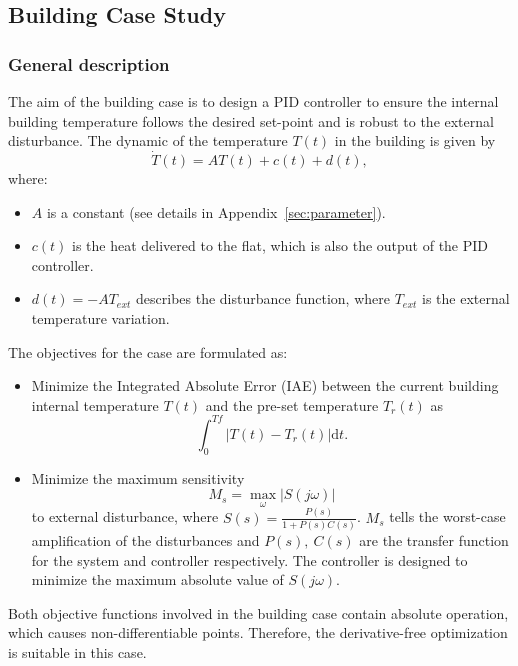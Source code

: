 \documentclass[11pt,oneside,onecolumn,openright]{article}
\begin{document}
  \subsection{Building Case Study}\label{sec:building}
  \subsubsection{General description}
  The aim of the building case is to design a PID controller to ensure the internal building temperature follows the desired set-point and is robust to the external disturbance. The dynamic of the temperature $T(t)$ in the building is given by 
  \begin{equation}\label{equ:temp}
  \dot{T}(t)=A T(t)+c(t)+d(t),
  \end{equation}
   where:
  \begin{itemize}
    \item $A$ is a constant (see details in Appendix~\ref{sec:parameter}).
    \item $c(t)$ is the heat delivered to the flat, which is also the output of the PID controller.
    \item $d(t)=-AT_{ext}$ describes the disturbance function, where $T_{ext}$ is the external temperature variation.
  \end{itemize}
  The objectives for the case are formulated as:
  \begin{itemize}
    \item Minimize the Integrated Absolute Error (IAE) between the current building internal temperature $T(t)$ and the pre-set temperature $T_r(t)$ as 
    \begin{equation}
  \int_{0}^{T f}\left|T(t)-T_{r}(t)\right| \mathrm{d} t.
  \end{equation}\label{equ:dist}
    \item Minimize the maximum sensitivity 
      \begin{equation}
  M_{s}=\max_{\omega}|S(j \omega)|
  \end{equation}
     to external disturbance, where $S(s)=\frac{P(s)}{1+P(s) C(s)}$. $M_s$ tells the worst-case amplification of the disturbances and $P(s),\ C(s)$ are the transfer function for the system and controller respectively. The controller is designed to minimize the maximum absolute value of $S(j\omega)$.
  \end{itemize}

  Both objective functions involved in the building case contain absolute operation, which causes non-differentiable points. Therefore, the derivative-free optimization is suitable in this case.
\end{document}
